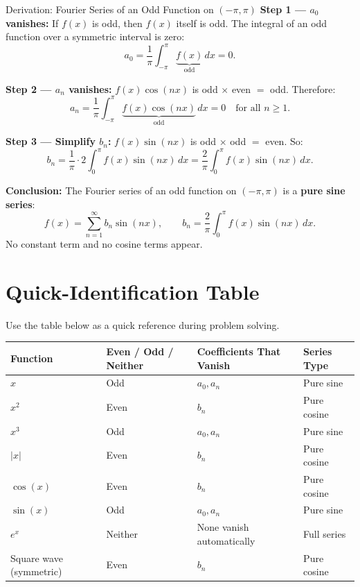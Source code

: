 \documentclass[12pt,a4paper]{article}
\begin{document}
\begin{infobox}{Derivation: Fourier Series of an Odd Function on $(-\pi,\pi)$}
\textbf{Step 1 --- $a_0$ vanishes:}
If $f(x)$ is odd, then $f(x)$ itself is odd. The integral of an odd function over a symmetric
interval is zero:
\[
  a_0 = \frac{1}{\pi}\int_{-\pi}^{\pi} \underbrace{f(x)}_{\text{odd}} \,dx = 0.
\]

\textbf{Step 2 --- $a_n$ vanishes:}
$f(x)\cos(nx)$ is odd $\times$ even $=$ odd. Therefore:
\[
  a_n = \frac{1}{\pi}\int_{-\pi}^{\pi} \underbrace{f(x)\cos(nx)}_{\text{odd}} \,dx = 0
  \quad \text{for all } n \geq 1.
\]

\textbf{Step 3 --- Simplify $b_n$:}
$f(x)\sin(nx)$ is odd $\times$ odd $=$ even. So:
\[
  b_n = \frac{1}{\pi}\cdot 2\int_{0}^{\pi} f(x)\sin(nx)\,dx
      = \frac{2}{\pi}\int_{0}^{\pi} f(x)\sin(nx)\,dx.
\]

\textbf{Conclusion:} The Fourier series of an odd function on $(-\pi,\pi)$ is a
\textbf{pure sine series}:
\[
  \boxed{f(x) = \sum_{n=1}^{\infty} b_n\sin(nx),}
  \qquad
  b_n = \frac{2}{\pi}\int_{0}^{\pi} f(x)\sin(nx)\,dx.
\]
No constant term and no cosine terms appear.
\end{infobox}

\section{Quick-Identification Table}

Use the table below as a quick reference during problem solving.

\begin{center}
\begin{tabular}{@{}llll@{}}
\toprule
\textbf{Function} & \textbf{Even / Odd / Neither} &
\textbf{Coefficients That Vanish} & \textbf{Series Type} \\
\midrule
$x$             & Odd     & $a_0, a_n$        & Pure sine \\
$x^2$           & Even    & $b_n$             & Pure cosine \\
$x^3$           & Odd     & $a_0, a_n$        & Pure sine \\
$|x|$           & Even    & $b_n$             & Pure cosine \\
$\cos(x)$       & Even    & $b_n$             & Pure cosine \\
$\sin(x)$       & Odd     & $a_0, a_n$        & Pure sine \\
$e^x$           & Neither & None vanish automatically & Full series \\
Square wave (symmetric) & Even & $b_n$         & Pure cosine \\
\bottomrule
\end{tabular}
\end{center}
\end{document}
